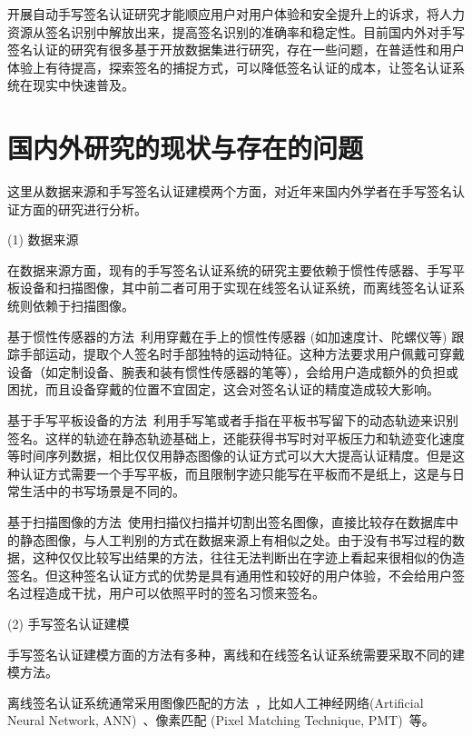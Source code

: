 开展自动手写签名认证研究才能顺应用户对用户体验和安全提升上的诉求，将人力资源从签名识别中解放出来，提高签名识别的准确率和稳定性。目前国内外对手写签名认证的研究有很多基于开放数据集进行研究，存在一些问题，在普适性和用户体验上有待提高，探索签名的捕捉方式，可以降低签名认证的成本，让签名认证系统在现实中快速普及。

\section{国内外研究的现状与存在的问题}
这里从数据来源和手写签名认证建模两个方面，对近年来国内外学者在手写签名认证方面的研究进行分析。

(1) 数据来源

在数据来源方面，现有的手写签名认证系统的研究主要依赖于惯性传感器、手写平板设备和扫描图像，其中前二者可用于实现在线签名认证系统，而离线签名认证系统则依赖于扫描图像。

基于惯性传感器的方法~\cite{levy2018handwritten,griswold2019wearables,bunke2011online}利用穿戴在手上的惯性传感器 (如加速度计、陀螺仪等) 跟踪手部运动，提取个人签名时手部独特的运动特征。这种方法要求用户佩戴可穿戴设备（如定制设备、腕表和装有惯性传感器的笔等），会给用户造成额外的负担或困扰，而且设备穿戴的位置不宜固定，这会对签名认证的精度造成较大影响。{}

基于手写平板设备的方法~\cite{fischer2015robust,kholmatov2005identity,sae2013simple}利用手写笔或者手指在平板书写留下的动态轨迹来识别签名。这样的轨迹在静态轨迹基础上，还能获得书写时对平板压力和轨迹变化速度等时间序列数据，相比仅仅用静态图像的认证方式可以大大提高认证精度。但是这种认证方式需要一个手写平板，而且限制字迹只能写在平板而不是纸上，这是与日常生活中的书写场景是不同的。

基于扫描图像的方法~\cite{hafemann2017learning,hafemann2018fixed,ferrer2005offline,kalera2004offline}使用扫描仪扫描并切割出签名图像，直接比较存在数据库中的静态图像，与人工判别的方式在数据来源上有相似之处。由于没有书写过程的数据，这种仅仅比较写出结果的方法，往往无法判断出在字迹上看起来很相似的伪造签名。但这种签名认证方式的优势是具有通用性和较好的用户体验，不会给用户签名过程造成干扰，用户可以依照平时的签名习惯来签名。

(2) 手写签名认证建模

手写签名认证建模方面的方法有多种，离线和在线签名认证系统需要采取不同的建模方法。

离线签名认证系统通常采用图像匹配的方法~\cite{赵桂敏2003手写签名的快速认证}，比如人工神经网络(Artificial Neural Network, ANN)~\cite{chandra2016offline}、像素匹配 (Pixel Matching Technique, PMT)~\cite{bhattacharya2013offline}等。 


